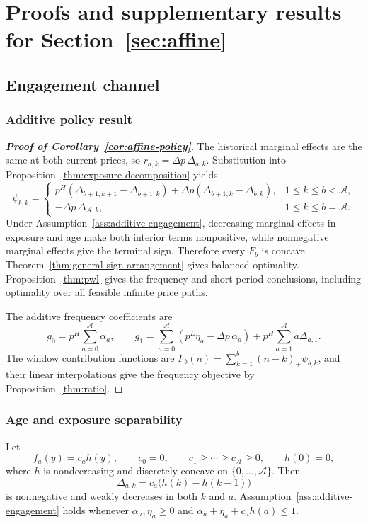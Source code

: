 \section{Proofs and supplementary results for Section~\ref{sec:affine}}
\label{app:affine-proofs}
\subsection{Engagement channel}
\label{app:affine-extensions}

\subsubsection{Additive policy result}
\begin{proof}[\normalfont\bfseries Proof of Corollary~\ref{cor:affine-policy}]
The historical marginal effects are the same at both current prices, so \(r_{a,k}=\Delta p\,\Delta_{a,k}\). {\color{black}Substitution into Proposition~\ref{thm:exposure-decomposition} yields
\[
 \psi_{b,k}=\begin{cases}
 p^H(\Delta_{b+1,k+1}-\Delta_{b+1,k})
 +\Delta p(\Delta_{b+1,k}-\Delta_{b,k}),
     &1\le k\le b<\mathcal A,\\
 -\Delta p\,\Delta_{\mathcal A,k},
     &1\le k\le b=\mathcal A.
 \end{cases}
\]
}\noindent Under Assumption~\ref{ass:additive-engagement}, decreasing marginal effects in exposure and age make both interior terms nonpositive, while nonnegative marginal effects give the terminal sign. Therefore every \(F_b\) is concave. Theorem~\ref{thm:general-sign-arrangement} gives balanced optimality. Proposition~\ref{thm:pwl} gives the frequency and short period conclusions, including optimality over all feasible infinite price paths.

The additive frequency coefficients are
\[
 g_0=p^H\sum_{a=0}^{\mathcal A}\alpha_a,\qquad
 g_1=\sum_{a=0}^{\mathcal A}(p^L\eta_a-\Delta p\,\alpha_a)
      +p^H\sum_{a=1}^{\mathcal A}a \Delta_{a,1}.
\]
The window contribution functions are \(F_b(n)=\sum_{k=1}^{b}(n-k)_+\psi_{b,k}\), and their linear interpolations give the frequency objective by Proposition~\ref{thm:ratio}.
\end{proof}

\subsubsection{Age and exposure separability}
\begin{example}\label{ex:separable-engagement}
Let
\[
 f_a(y)=c_a h(y),\qquad c_0=0,\qquad
 c_1\ge\cdots\ge c_{\mathcal A}\ge0,\qquad h(0)=0,
\]
where \(h\) is nondecreasing and discretely concave on \(\{0,\ldots,\mathcal A\}\). Then
\[
 \Delta_{a,k}=c_a\bigl(h(k)-h(k-1)\bigr)
\]
is nonnegative and weakly decreases in both \(k\) and \(a\). Assumption~\ref{ass:additive-engagement} holds whenever \(\alpha_a,\eta_a\ge0\) and \(\alpha_a+\eta_a+c_a h(a)\le1\).
\end{example}

